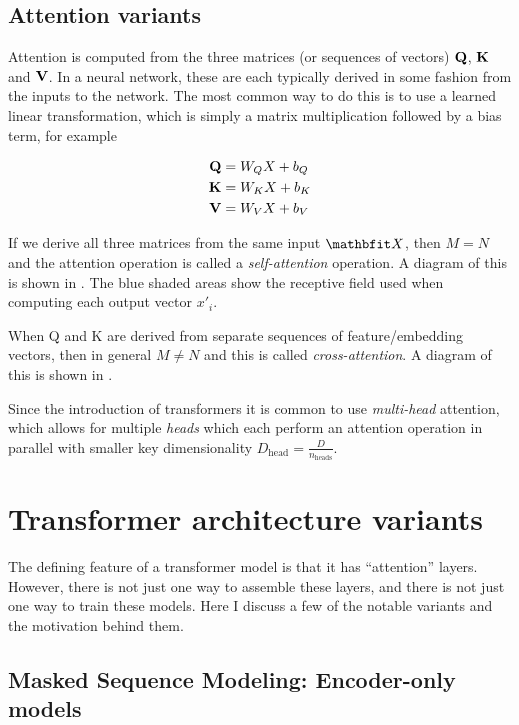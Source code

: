 

\subsection{Attention variants}

Attention is computed from the three matrices (or sequences of vectors) $\mathbf{Q}$, $\mathbf{K}$ and $\mathbf{V}$. In a neural network, these are each typically derived in some fashion from the inputs to the network. The most common way to do this is to use a learned linear transformation, which is simply a matrix multiplication followed by a bias term, for example

\begin{align}
\label{eqn:attn-linear}
\mathbf{Q} &= W_{Q} X + b_{Q} \\
\mathbf{K} &= W_{K} X + b_{K} \\
\mathbf{V} &= W_{V} X + b_{V}
\end{align}

If we derive all three matrices from the same input $\X$, then $M = N$ and the attention operation is called a \textit{self-attention} operation. A diagram of this is shown in . The blue shaded areas show the receptive field used when computing each output vector $x'_i$.

When Q and K are derived from separate sequences of feature/embedding vectors, then in general $M ≠ N$ and this is called \textit{cross-attention}. A diagram of this is shown in .



Since the introduction of transformers it is common to use \textit{multi-head} attention, which allows for multiple \textit{heads} which each perform an attention operation in parallel with smaller key dimensionality $D_{\text{head}} = \frac{D}{ n_{\text{heads}}}$.


\section{Transformer architecture variants}

The defining feature of a transformer model is that it has ``attention'' layers. However, there is not just one way to assemble these layers, and there is not just one way to train these models. Here I discuss a few of the notable variants and the motivation behind them.

\subsection{Masked Sequence Modeling: Encoder-only models}
\label{ss:msm}

